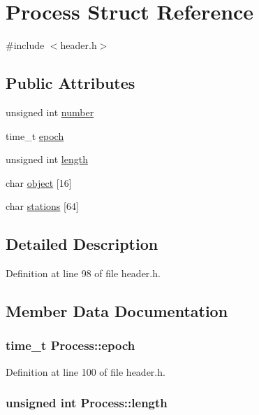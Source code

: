 \hypertarget{structProcess}{
\section{Process Struct Reference}
\label{structProcess}
}


{\ttfamily \#include $<$header.h$>$}\subsection*{Public Attributes}
\begin{DoxyCompactItemize}
\item 
unsigned int \hyperlink{structProcess_a0505f4284097ad8aabf18926a5578c9f}{number}
\item 
time\_\-t \hyperlink{structProcess_a9a543019c0d7ffc5c7f751ca7b2f4f91}{epoch}
\item 
unsigned int \hyperlink{structProcess_a54e6c4e571b27f56375fd2cdc8f00882}{length}
\item 
char \hyperlink{structProcess_acbb3edd0ee2d297e6203318be0b55de7}{object} \mbox{[}16\mbox{]}
\item 
char \hyperlink{structProcess_ac1ecae0ac385fb0eb5ec2a30a416ad2c}{stations} \mbox{[}64\mbox{]}
\end{DoxyCompactItemize}


\subsection{Detailed Description}


Definition at line 98 of file header.h.

\subsection{Member Data Documentation}
\hypertarget{structProcess_a9a543019c0d7ffc5c7f751ca7b2f4f91}{
\subsubsection[{epoch}]{\setlength{\rightskip}{0pt plus 5cm}time\_\-t {\bf Process::epoch}}}
\label{structProcess_a9a543019c0d7ffc5c7f751ca7b2f4f91}


Definition at line 100 of file header.h.\hypertarget{structProcess_a54e6c4e571b27f56375fd2cdc8f00882}{
\subsubsection[{length}]{\setlength{\rightskip}{0pt plus 5cm}unsigned int {\bf Process::length}}}
\label{structProcess_a54e6c4e571b27f56375fd2cdc8f00882}


